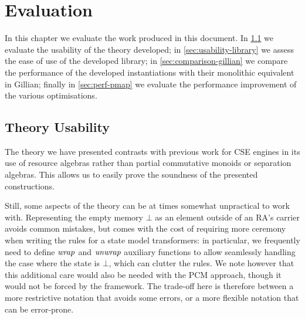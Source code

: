 \chapter{Evaluation} \label{chap:evaluation}

In this chapter we evaluate the work produced in this document. In \cref{sec:usability-theory} we evaluate the usability of the theory developed; in \cref{sec:usability-library} we assess the ease of use of the developed library; in \cref{sec:comparison-gillian} we compare the performance of the developed instantiations with their monolithic equivalent in Gillian; finally in \cref{sec:perf-pmap} we evaluate the performance improvement of the various \PMap{} optimisations.

\section{Theory Usability} \label{sec:usability-theory}

The theory we have presented contrasts with previous work for CSE engines in its use of resource algebras rather than partial commutative monoids or separation algebras. This allows us to easily prove the soundness of the presented constructions.

Still, some aspects of the theory can be at times somewhat unpractical to work with. Representing the empty memory $\bot$ as an element outside of an RA's carrier avoids common mistakes, but comes with the cost of requiring more ceremony when writing the rules for a state model transformers: in particular, we frequently need to define ${\operatorname{\mathit{wrap}}}$ and ${\operatorname{\mathit{unwrap}}}$ auxiliary functions to allow seamlessly handling the case where the state is $\bot$, which can clutter the rules. We note however that this additional care would also be needed with the PCM approach, though it would not be forced by the framework. The trade-off here is therefore between a more restrictive notation that avoids some errors, or a more flexible notation that can be error-prone.

